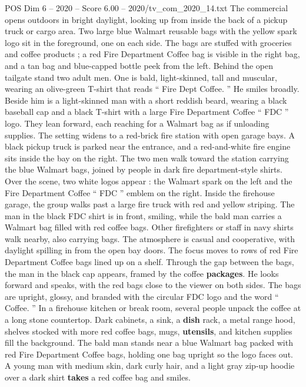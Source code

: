 \begin{textsample}{POS Dim 6 – 2020 – Score 6.00 – 2020/tv\_com\_2020\_14.txt}  \label{ex:f6_pos_070}
The commercial opens outdoors in bright daylight, looking up from inside the back of a pickup truck or cargo area.
Two large blue Walmart reusable bags with the yellow spark logo sit in the foreground, one on each side.
The bags are stuffed with groceries and coffee products ; a red Fire Department Coffee bag is visible in the right bag, and a tan bag and blue-capped bottle peek from the left.
Behind the open tailgate stand two adult men.
One is bald, light-skinned, tall and muscular, wearing an olive-green T-shirt that reads “ Fire Dept Coffee. ” He smiles broadly.
Beside him is a light-skinned man with a short reddish beard, wearing a black baseball cap and a black T-shirt with a large Fire Department Coffee “ FDC ” logo.
They lean forward, each reaching for a Walmart bag as if unloading supplies.
The setting widens to a red-brick fire station with open garage bays.
A black pickup truck is parked near the entrance, and a red-and-white fire engine sits inside the bay on the right.
The two men walk toward the station carrying the blue Walmart bags, joined by people in dark fire department-style shirts.
Over the scene, two white logos appear : the Walmart spark on the left and the Fire Department Coffee “ FDC ” emblem on the right.
Inside the firehouse garage, the group walks past a large fire truck with red and yellow striping.
The man in the black FDC shirt is in front, smiling, while the bald man carries a Walmart bag filled with red coffee bags.
Other firefighters or staff in navy shirts walk nearby, also carrying bags.
The atmosphere is casual and cooperative, with daylight spilling in from the open bay doors.
The focus moves to rows of red Fire Department Coffee bags lined up on a shelf.
Through the gap between the bags, the man in the black cap appears, framed by the coffee \textbf{packages}.
He looks forward and speaks, with the red bags close to the viewer on both sides.
The bags are upright, glossy, and branded with the circular FDC logo and the word “ Coffee. ” In a firehouse kitchen or break room, several people unpack the coffee at a long stone countertop.
Dark cabinets, a sink, a \textbf{dish} rack, a metal range hood, shelves stocked with more red coffee bags, mugs, \textbf{utensils}, and kitchen supplies fill the background.
The bald man stands near a blue Walmart bag packed with red Fire Department Coffee bags, holding one bag upright so the logo faces out.
A young man with medium skin, dark curly hair, and a light gray zip-up hoodie over a dark shirt \textbf{takes} a red coffee bag and smiles.

\end{textsample}
